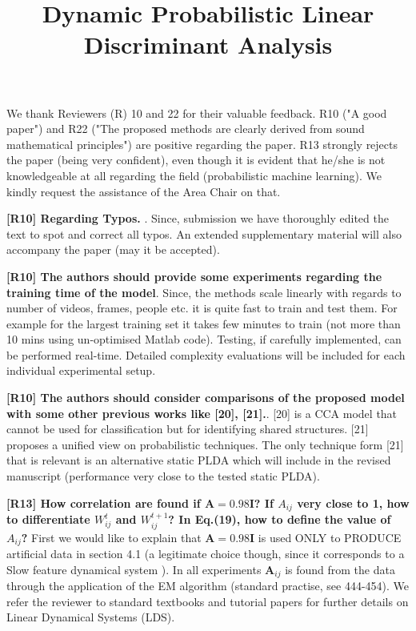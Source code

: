 \documentclass[10pt,twocolumn,letterpaper]{article}
\begin{document}
\title{Dynamic Probabilistic Linear Discriminant Analysis}  %

\maketitle
\thispagestyle{empty}


We thank Reviewers (R) 10 and 22 for their valuable feedback. R10 ("A good paper") and R22 ("The proposed methods are clearly derived from sound mathematical principles") are positive regarding the paper. R13 strongly rejects the paper (being very confident), even though it is evident that he/she is not knowledgeable at all regarding the field (probabilistic machine learning). We kindly request the assistance of the Area Chair on that.    %


\textbf{[R10] Regarding Typos. }. Since, submission we have thoroughly edited the text to spot and correct all typos. An extended supplementary material will also accompany the paper (may it be accepted).  

\textbf{[R10] The authors should provide some experiments regarding the training time of the model}. Since, the methods scale linearly with regards to number of videos, frames, people etc. it is quite fast to train and test them. For example for the largest training set it takes few minutes to train (not more than 10 mins using un-optimised Matlab code). Testing, if carefully implemented, can be performed real-time. Detailed complexity evaluations will be included for each individual experimental setup. 

\textbf{[R10] The authors should consider comparisons of the proposed model with some other previous works like [20], [21].}. [20] is a CCA model that cannot be used for classification but for identifying shared structures. [21] proposes a unified view on probabilistic techniques. The only technique form [21] that is relevant is an alternative static PLDA which will include in the revised manuscript (performance very close to the tested static PLDA). 


\textbf{[R13] How correlation are found if $\mathbf{A}=0.98\mathbf{I}$? If $A_{ij}$ very close to 1, how to differentiate $W_{ij}^t$ and $W_{ij}^{t+1}$? In Eq.(19), how to define the value of $A_{ij}$?}
First we would like to explain that $\mathbf{A}=0.98\mathbf{I}$ is used ONLY to PRODUCE artificial data in section 4.1 (a legitimate choice though, since it corresponds to a Slow feature dynamical system \cite{turner2007maximum}). In all experiments $\mathbf{A}_{ij}$ is found from the data through the application of the EM algorithm (standard practise, see 444-454). We refer the reviewer to standard textbooks \cite{bishop2006pattern} and tutorial papers \cite{roweis1999unifying} for further details on Linear Dynamical Systems (LDS). 
\end{document}
